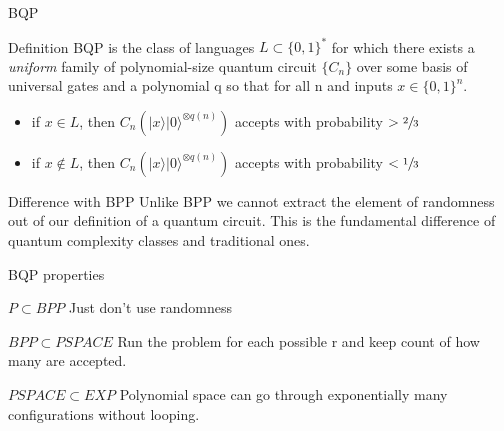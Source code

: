     \begin{frame}{BQP}
        \begin{block}{Definition}
            BQP is the class of languages  $L \subset \{0,1\}^*$ for which there exists a \emph{uniform}
            family of polynomial-size quantum circuit $\{C_n\}$ over some basis of universal gates and a polynomial q
            so that for all n and inputs $x \in \{0,1\}^n$.
            \begin{itemize}
                \item if $x \in L$, then $C_n(|x\rangle|0\rangle^{\otimes q(n)})$ accepts with probability $> \sfrac{2}{3}$
                \item if $x \notin L$, then $C_n(|x\rangle|0\rangle^{\otimes q(n)})$ accepts with probability $< \sfrac{1}{3}$
            \end{itemize}
        \end{block}
        \pause
        \begin{alertblock}{Difference with BPP}
            Unlike BPP we cannot extract the element of randomness out of our definition of a quantum circuit.
            This is the fundamental difference of quantum complexity classes and traditional ones. 
        \end{alertblock}
    \end{frame}
    \begin{frame}{BQP properties}
        \begin{block}{$P \subset BPP$}
            \pause
            Just don't use randomness
        \end{block}
        \pause
        \begin{block}{$BPP \subset PSPACE$}
            \pause
            Run the problem for each possible r and keep count of how many are accepted.
        \end{block}
        \pause
        \begin{block}{$PSPACE \subset EXP$}
            \pause
            Polynomial space can go through exponentially many configurations without looping.
        \end{block}
    \end{frame}
